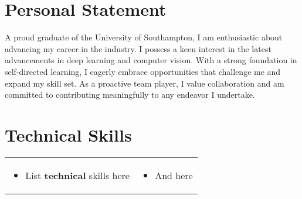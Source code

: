 \documentclass[letterpaper]{twentysecondcv} %
\begin{document}





\makeprofile %



\section*{Personal Statement}


A proud graduate of the University of Southampton, I am enthusiastic about advancing my career in the industry. I possess a keen interest in the latest advancements in deep learning and computer vision. With a strong foundation in self-directed learning, I eagerly embrace opportunities that challenge me and expand my skill set. As a proactive team player, I value collaboration and am committed to contributing meaningfully to any endeavor I undertake.





\section*{Technical Skills}

\cvtags



\begin{tabularx}{\linewidth}{XX}
	\begin{itemize}
		\item List \textbf{technical} skills here
	\end{itemize} & 
	\begin{itemize}
		\item And here
	\end{itemize} \\
\end{tabularx}
\end{document}
